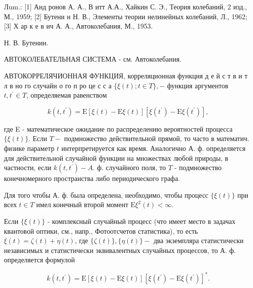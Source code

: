 \documentclass[10pt]{article}
\begin{document}
Лum.: [1] Анд ронов А. А., В итт А.А., Хайкин С. Э., Теория колебаний, 2 изд., М., 1959; [2] Бутени н Н. В., Элементы теории нелинейных колебаний, Л., 1962; [3] Х ар к е в ич А. А., Автоколебания, М., 1953.



Н. В. Бутенин.



АВТОКОЛЕБАТЕЛЬНАЯ СИСТЕМА - см. Автоколебания.



АВТОКОРРЕЛЯЧИОННАЯ ФУНКЦИЯ, корреляционная функция д е й с т в и т л в но го случайн о го п ро це с с а $\{\xi(t) ; t \in T\},-$ функция аргументов $t, t^{\prime} \in T$, определяемая равенством



\[

k\left(t, t^{\prime}\right)=\mathrm{E}[\xi(t)-\mathrm{E} \xi(t)]\left[\xi\left(t^{\prime}\right)-\mathrm{E} \xi\left(t^{\prime}\right)\right],

\]



где E - математическое ожидание по распределению вероятностей процесса $\{\xi(t)\}$. Если $T-$ подмножество действительной прямой, то часто в математич. физике параметр $t$ интерпретируется как время. Аналогично А. ф. определяется для действительной случайной функции на множествах любой природы, в частности, если $k\left(t, t^{\prime}\right)-A$. ф. случайного поля, то $T$ - подмножество конечномерного пространства либо периодического графа.



Для того чтобы А. ф. была определена, необходимо, чтобы процесс $\{\xi(t)\}$ при всех $t \in T$ имел конечный второй момент $\mathrm{E} \xi^{2}(t)<\infty$.



Если $\{\xi(t)\}$ - комплексный случайный процесс (что имеет место в задачах квантовой оптики, см., напр., Фотоотсчетов статистика), то есть $\xi(t)=\zeta(t)+\dot{\eta}(t)$, где $\{\zeta(t)\},\{\eta(t)\}-$ два экземпляра статистически независимых и статистически эквивалентных случайных процессов, то А. ф. определяется формулой



\[

k\left(t, t^{\prime}\right)=\mathrm{E}[\xi(t)-\mathrm{E} \xi(t)]\left[\xi\left(t^{\prime}\right)-\mathrm{E} \xi\left(t^{\prime}\right)\right]^{*} .

\]
\end{document}
